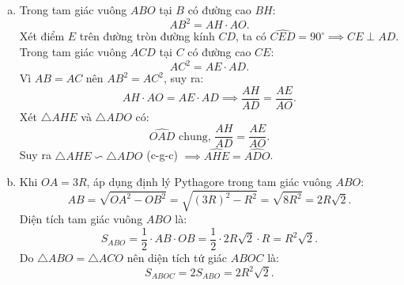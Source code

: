 \begin{bt}
{\begin{enumerate}[a)]
    Mặt khác, $CD$ là đường kính của $(O)$ nên $\widehat{DBC} = 90^\circ \implies BD \perp BC$.\\
    Từ $OA \perp BC$ và $BD \perp BC$ suy ra $BD \parallel OA$.
    \item Trong tam giác vuông $ABO$ tại $B$ có đường cao $BH$:
    $$AB^2 = AH \cdot AO.$$
    Xét điểm $E$ trên đường tròn đường kính $CD$, ta có $\widehat{CED} = 90^\circ \implies CE \perp AD$.\\
    Trong tam giác vuông $ACD$ tại $C$ có đường cao $CE$:
    $$AC^2 = AE \cdot AD.$$
    Vì $AB = AC$ nên $AB^2 = AC^2$, suy ra:
    $$AH \cdot AO = AE \cdot AD \implies \dfrac{AH}{AD} = \dfrac{AE}{AO}.$$
    Xét $\triangle AHE$ và $\triangle ADO$ có:
    $$\widehat{OAD}\text{ chung, } \dfrac{AH}{AD} = \dfrac{AE}{AO}.$$
    Suy ra $\triangle AHE \backsim \triangle ADO$ (c-g-c) $\implies \widehat{AHE} = \widehat{ADO}$.
    \item Khi $OA = 3R$, áp dụng định lý Pythagore trong tam giác vuông $ABO$:
    $$AB = \sqrt{OA^2 - OB^2} = \sqrt{(3R)^2 - R^2} = \sqrt{8R^2} = 2R\sqrt{2}.$$
    Diện tích tam giác vuông $ABO$ là:
    $$S_{ABO} = \dfrac{1}{2} \cdot AB \cdot OB = \dfrac{1}{2} \cdot 2R\sqrt{2} \cdot R = R^2\sqrt{2}.$$
    Do $\triangle ABO = \triangle ACO$ nên diện tích tứ giác $ABOC$ là:
    $$S_{ABOC} = 2S_{ABO} = 2R^2\sqrt{2}.$$
\end{enumerate}
}
\end{bt}

